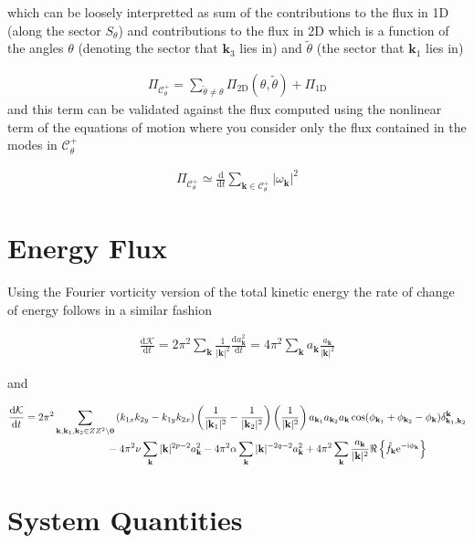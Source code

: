 \documentclass[9pt]{article}
\newcommand{\der}[2]{\frac{\mathrm{d}#1}{\mathrm{d}#2}}          	 %
\newcommand{\ii}{\mathrm{i}}      								  %
\newcommand{\e}{\mathrm{e}}      								  %
\newcommand{\bfk}{\mathbf{k}}								%
\newcommand{\bfkn}[1]{\mathbf{k}_{#1}}								%
\begin{document}
which can be loosely interpretted as sum of the contributions to the flux in 1D (along the sector $S_\theta$) and contributions to the flux in 2D which is a function of the angles $\theta$ (denoting the sector that $\bfkn{3}$ lies in) and $\tilde{\theta}$ (the sector that $\bfkn{1}$ lies in)
	
\begin{align}
	\Pi_{\mathcal{C}_{\theta}^{+}} = \sum_{\tilde{\theta} \neq \theta} \Pi_{\text{2D}}(\theta, \tilde{\theta}) + \Pi_{\text{1D}}
\end{align}
and this term can be validated against the flux computed using the nonlinear term of the equations of motion where you consider only the flux contained in the modes in $\mathcal{C}_{\theta}^{+}$

\begin{align}
	\Pi_{\mathcal{C}_{\theta}^{+}} \simeq \der{}{t} \sum_{\bfk \in \mathcal{C}_{\theta}^{+}} |\omega_{\bfk}|^2
\end{align}

\section{Energy Flux}

Using the Fourier vorticity version of the total kinetic energy the rate of change of energy follows in a similar fashion

\begin{align}
	\der{\mathcal{K}}{t} = 2\pi^2\sum_{\bfk}  \frac{1}{|\bfk|^2}\der{a_\bfk^2}{t} =4\pi^2\sum_{\bfk} a_\bfk \frac{\dot{a}_\bfk}{|\bfk|^2}
\end{align}

and 

\begin{align}
	\der{\mathcal{K}}{t} &= 2\pi^2	\sum_{\bfk, \mathbf{k}_1, \mathbf{k}_2\in \mathbb{Z}^2\setminus \mathbf{0}}\left(k_{1x}k_{2y} - k_{1y}k_{2x}\right) \left(\frac{1}{|\bfkn{1}|^2} - \frac{1}{|\bfkn{2}|^2}\right) \left( \frac{1}{|\bfk|^2}\right)a_{\bfkn{1}} a_{\bfkn{2}} a_{\bfk} \cos(\phi_{\bfkn{1}} + \phi_{\bfkn{2}} - \phi_{\bfk})\delta_{\bfkn{1}, \bfkn{2}}^{\bfk} \notag \\ & \qquad \qquad \qquad \qquad- 4\pi^2\nu \sum_{\bfk}|\bfk|^{2p - 2} a_{\bfk}^2 - 4\pi^2\alpha\sum_{\bfk}|\bfk|^{-2q - 2} a_\bfk^2 + 4\pi^2\sum_{\bfk}\frac{a_\bfk}{|\bfk|^2}\Re\left\{\hat{f}_{\bfk} \e^{-\ii\phi_\bfk}\right\}
\end{align}

\section{System Quantities}
\end{document}
